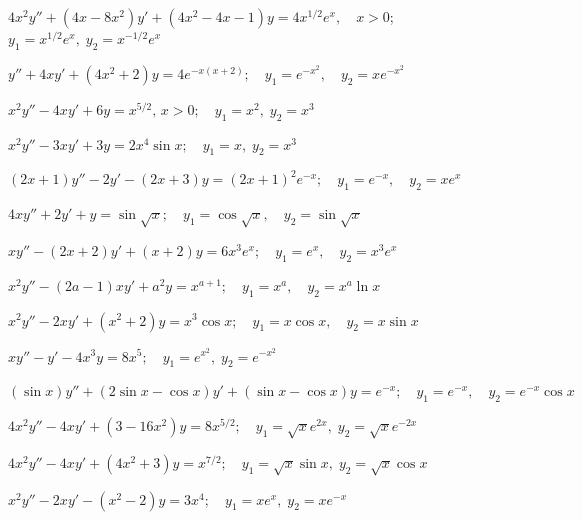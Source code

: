 \begin{exerciselist}
  \item\label{exer:5.7.9} $4x^{2}y''+(4x-8x^{2})y'+(4x^{2}-4x-1)y=4x^{1/2}e^{x},\quad x>0$;
  \newline
  $y_{1}=x^{1/2}e^{x},\;y_{2}=x^{-1/2}e^{x}$

  \item\label{exer:5.7.10}
        $y''+4xy'+(4x^{2}+2)y=4e^{-x(x+2)};\quad y_{1}=e^{-x^{2}}, \quad y_{2}=xe^{-x^{2}}$

  \item\label{exer:5.7.11} $x^{2}y''-4xy'+6y=x^{5/2},\,x>0;\quad y_{1}=x^{2},\;y_{2}=x^{3}$

  \item\label{exer:5.7.12} $x^{2}y''-3xy'+3y=2x^{4}\sin x;\quad y_{1}=x,\;y_{2}=x^{3}$

  \item\label{exer:5.7.13}
        $(2x+1)y''-2y'-(2x+3)y=(2x+1)^{2}e^{-x};\quad y_{1}=e^{-x}, \quad y_{2}=xe^{x}$

  \item\label{exer:5.7.14}
        $4xy''+2y'+y=\sin\sqrt{x};\quad y_{1}=\cos\sqrt{x}, \quad y_{2}=\sin\sqrt{x}$

  \item\label{exer:5.7.15}
        $xy''-(2x+2)y'+(x+2)y=6x^{3}e^{x};\quad y_{1}=e^{x},\quad y_{2}=x^{3}e^{x}$

  \item\label{exer:5.7.16}
        $x^{2}y''-(2a-1)xy'+a^{2}y=x^{a+1};\quad y_{1}=x^{a}, \quad y_{2}=x^{a}\ln x$

  \item\label{exer:5.7.17}
        $x^{2}y''-2xy'+(x^{2}+2)y=x^{3}\cos x;\quad y_{1}=x\cos x, \quad y_{2}=x\sin x$

  \item\label{exer:5.7.18} $xy''-y'-4x^{3}y=8x^{5};\quad y_{1}=e^{x^{2}},\;y_{2}=e^{-x^{2}}$

  \item\label{exer:5.7.19}
        $(\sin x)y''+(2\sin x-\cos x)y'+(\sin x-\cos x)y=e^{-x};\quad y_{1}=e^{-x},\quad y_{2}=e^{-x}\cos x$

  \item\label{exer:5.7.20}
        $4x^{2}y''-4xy'+(3-16x^{2})y=8x^{5/2};\quad y_{1}=\sqrt{x}e^{2x},\;y_{2}=\sqrt{x}e^{-2x}$

  \item\label{exer:5.7.21}
        $4x^{2}y''-4xy'+(4x^{2}+3)y=x^{7/2};\quad y_{1}=\sqrt{x}\sin x,\; y_{2}=\sqrt{x}\cos x$

  \item\label{exer:5.7.22} $x^{2}y''-2xy'-(x^{2}-2)y=3x^{4};\quad y_{1}=xe^{x},\;y_{2}=xe^{-x}$


\end{exerciselist}
